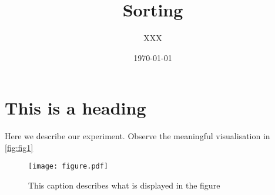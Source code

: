 \documentclass{article}
\title{Sorting}
\author{XXX}
\date{\today}
\begin{document}
    \maketitle
   
    \section{This is a heading}
    Here we describe our experiment. Observe the meaningful visualisation in \autoref{fig:fig1}
    \begin{figure}[htb]
    	\centering
    	\texttt{[image: figure.pdf]}
    	\caption{This caption describes what is displayed in the figure}
    	\label{fig:fig1}
    \end{figure}
\end{document}
